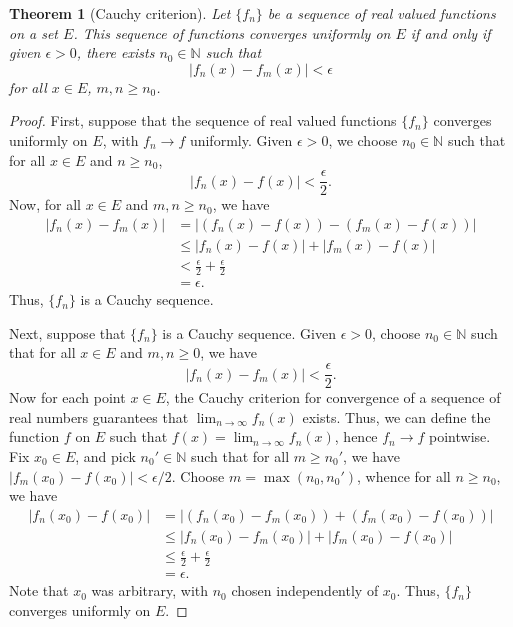 \documentclass[11pt]{article}
\def\N{\mathbb{N}}
\newtheorem{theorem}{Theorem}[section]
\theoremstyle{definition}
\theoremstyle{remark}
\begin{document}
    \begin{theorem}[Cauchy criterion] \label{theo:cauchy_criterion}
        Let $\{f_n\}$ be a sequence of real valued functions on a set $E$.
        This sequence of functions converges uniformly on $E$ if and only if given
        $\epsilon > 0$, there exists $n_0 \in \N$ such that \[
            |f_n(x) - f_m(x)| < \epsilon
        \] for all $x \in E$, $m, n \geq n_0$.
    \end{theorem} 
    \begin{proof}
        First, suppose that the sequence of real valued functions $\{f_n\}$ converges
        uniformly on $E$, with $f_n \to f$ uniformly. Given $\epsilon > 0$, we choose
        $n_0 \in \N$ such that for all $x \in E$ and $n \geq n_0$, \[
            |f_n(x) - f(x)| < \frac{\epsilon}{2}.
        \] Now, for all $x \in E$ and $m, n \geq n_0$, we have
        \begin{align*}
            |f_n(x) - f_m(x)| &= |(f_n(x) - f(x)) - (f_m(x) - f(x))| \\
            &\leq |f_n(x) - f(x)| + |f_m(x) - f(x)| \\
            & < \frac{\epsilon}{2} + \frac{\epsilon}{2} \\
            &= \epsilon.
        \end{align*}
        Thus, $\{f_n\}$ is a Cauchy sequence.

        Next, suppose that $\{f_n\}$ is a Cauchy sequence. Given $\epsilon > 0$,
        choose $n_0 \in \N$ such that for all $x \in E$ and $m, n \geq 0$, we have \[
            |f_n(x) - f_m(x)| < \frac{\epsilon}{2}.
        \] Now for each point $x \in E$, the Cauchy criterion for convergence of a
        sequence of real numbers guarantees that $\lim_{n \to \infty} f_n(x)$ exists.
        Thus, we can define the function $f$ on $E$ such that $f(x) = \lim_{n \to
        \infty} f_n(x)$, hence $f_n \to f$ pointwise. Fix $x_0 \in E$, and pick $n_0'
        \in \N$ such that for all $m \geq n_0'$, we have $|f_m(x_0) - f(x_0)| <
        \epsilon / 2$. Choose $m = \max(n_0, n_0')$, whence for all $n \geq n_0$, we
        have
        \begin{align*}
            |f_n(x_0) - f(x_0)| &= |(f_n(x_0) - f_m(x_0)) + (f_m(x_0) - f(x_0))| \\
            &\leq |f_n(x_0) - f_m(x_0)| + |f_m(x_0) - f(x_0)| \\
            &\leq \frac{\epsilon}{2} + \frac{\epsilon}{2} \\
            &= \epsilon.
        \end{align*}
        Note that $x_0$ was arbitrary, with $n_0$ chosen independently of $x_0$.
        Thus, $\{f_n\}$ converges uniformly on $E$.
    \end{proof}
    
\end{document}

